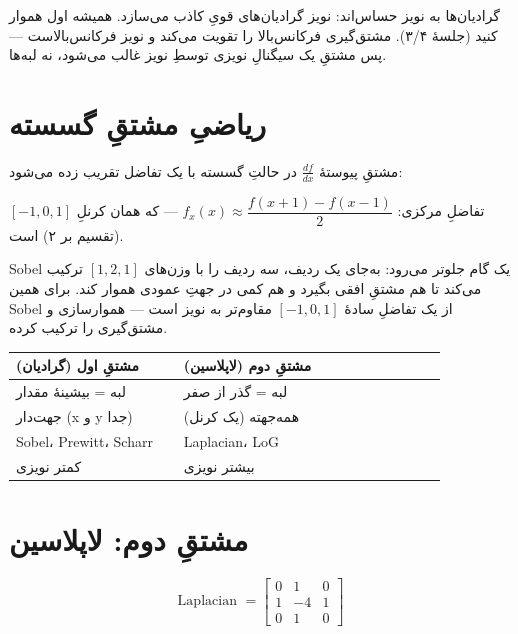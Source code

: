 \documentclass[12pt,a4paper]{article}
\begin{document}
\begin{hoshdar}
گرادیان‌ها به نویز حساس‌اند: نویز گرادیان‌های قویِ کاذب می‌سازد. همیشه اول هموار کنید (جلسهٔ ۳/۴).
مشتق‌گیری فرکانس‌بالا را تقویت می‌کند و نویز فرکانس‌بالاست — پس مشتقِ یک سیگنالِ نویزی توسطِ نویز
غالب می‌شود، نه لبه‌ها.
\end{hoshdar}

\section{ریاضیِ مشتقِ گسسته}

مشتقِ پیوستهٔ $\frac{df}{dx}$ در حالتِ گسسته با یک تفاضل تقریب زده می‌شود:

\begin{riyazi}
تفاضلِ مرکزی: $f_x(x) \approx \dfrac{f(x+1) - f(x-1)}{2}$ — که همان کرنلِ $[-1, 0, 1]$ (تقسیم بر ۲) است.
\end{riyazi}

Sobel یک گام جلوتر می‌رود: به‌جای یک ردیف، سه ردیف را با وزن‌های $[1, 2, 1]$ ترکیب می‌کند تا هم
مشتقِ افقی بگیرد و هم کمی در جهتِ عمودی هموار کند. برای همین Sobel از یک تفاضلِ سادهٔ $[-1,0,1]$
مقاوم‌تر به نویز است — هموارسازی و مشتق‌گیری را ترکیب کرده.

\begin{center}
\begin{tabular}{>{\raggedright\arraybackslash}p{0.35\linewidth} >{\raggedright\arraybackslash}p{0.55\linewidth}}
\toprule
\textbf{مشتقِ اول (گرادیان)} & \textbf{مشتقِ دوم (لاپلاسین)} \\
\midrule
لبه = بیشینهٔ مقدار & لبه = گذر از صفر \\
جهت‌دار (x و y جدا) & همه‌جهته (یک کرنل) \\
Sobel، Prewitt، Scharr & Laplacian، LoG \\
کمتر نویزی & بیشتر نویزی \\
\bottomrule
\end{tabular}
\end{center}

\section{مشتقِ دوم: لاپلاسین}

\[\text{Laplacian }= \begin{bmatrix}0&1&0\\1&-4&1\\0&1&0\end{bmatrix}\]
\end{document}
